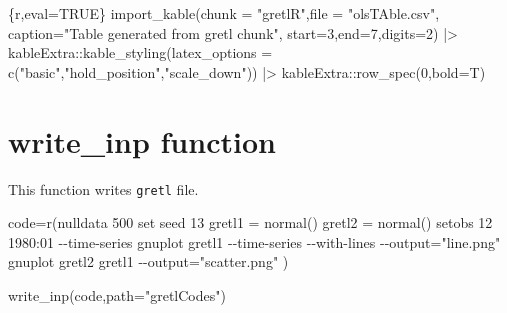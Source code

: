 \documentclass[
  letterpaper,
  DIV=11,
  numbers=noendperiod]{scrartcl}
\newenvironment{Shaded}{\begin{snugshade}}{\end{snugshade}}
\newcommand{\AttributeTok}[1]{\textcolor[rgb]{0.40,0.45,0.13}{#1}}
\newcommand{\DecValTok}[1]{\textcolor[rgb]{0.68,0.00,0.00}{#1}}
\newcommand{\FunctionTok}[1]{\textcolor[rgb]{0.28,0.35,0.67}{#1}}
\newcommand{\InformationTok}[1]{\textcolor[rgb]{0.37,0.37,0.37}{#1}}
\newcommand{\NormalTok}[1]{\textcolor[rgb]{0.00,0.23,0.31}{#1}}
\newcommand{\OtherTok}[1]{\textcolor[rgb]{0.00,0.23,0.31}{#1}}
\newcommand{\SpecialCharTok}[1]{\textcolor[rgb]{0.37,0.37,0.37}{#1}}
\newcommand{\StringTok}[1]{\textcolor[rgb]{0.13,0.47,0.30}{#1}}
\begin{document}
\begin{Shaded}
\begin{Highlighting}[]
\InformationTok{\textasciigrave{}\textasciigrave{}\textasciigrave{}\{r,eval=TRUE\}}
\FunctionTok{import\_kable}\NormalTok{(}\AttributeTok{chunk =} \StringTok{"gretlR"}\NormalTok{,}\AttributeTok{file =} \StringTok{"olsTAble.csv"}\NormalTok{,}
\AttributeTok{caption=}\StringTok{"Table generated from gretl chunk"}\NormalTok{, }
\AttributeTok{start=}\DecValTok{3}\NormalTok{,}\AttributeTok{end=}\DecValTok{7}\NormalTok{,}\AttributeTok{digits=}\DecValTok{2}\NormalTok{) }\SpecialCharTok{|\textgreater{}} 
\NormalTok{kableExtra}\SpecialCharTok{::}\FunctionTok{kable\_styling}\NormalTok{(}\AttributeTok{latex\_options =} \FunctionTok{c}\NormalTok{(}\StringTok{"basic"}\NormalTok{,}\StringTok{"hold\_position"}\NormalTok{,}\StringTok{"scale\_down"}\NormalTok{)) }\SpecialCharTok{|\textgreater{}}
\NormalTok{ kableExtra}\SpecialCharTok{::}\FunctionTok{row\_spec}\NormalTok{(}\DecValTok{0}\NormalTok{,}\AttributeTok{bold=}\NormalTok{T)}
\InformationTok{\textasciigrave{}\textasciigrave{}\textasciigrave{}}
\end{Highlighting}
\end{Shaded}

\begin{table}[!h]
\centering
\caption{Table generated from gretl chunk}
\centering
{}
\end{table}

\hypertarget{write_inp-function}{%
\section{write\_inp function}\label{write_inp-function}}

This function writes \texttt{gretl} file.

\begin{Shaded}
\begin{Highlighting}[]
\NormalTok{code}\OtherTok{=}\NormalTok{r}\StringTok{\textquotesingle{}(nulldata 500}
\StringTok{set seed 13}
\StringTok{gretl1 = normal()}
\StringTok{gretl2 = normal()}
\StringTok{setobs 12 1980:01 {-}{-}time{-}series}
\StringTok{gnuplot gretl1 {-}{-}time{-}series {-}{-}with{-}lines {-}{-}output="line.png"}
\StringTok{gnuplot gretl2 gretl1 {-}{-}output="scatter.png"}
\StringTok{)\textquotesingle{}}

\FunctionTok{write\_inp}\NormalTok{(code,}\AttributeTok{path=}\StringTok{"gretlCodes"}\NormalTok{)}
\end{Highlighting}
\end{Shaded}
\end{document}
